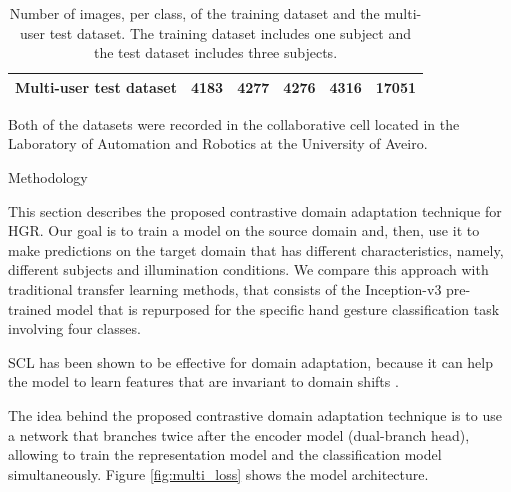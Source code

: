 \documentclass[final]{beamer}
\newlength{\colwidth}
\begin{document}
\begin{frame}[t]
\begin{columns}[t]
\begin{column}{\colwidth}
\begin{table}[!ht]
\begin{tabular}{lccccc}
      Multi-user test dataset & \num{4183} & \num{4277} & \num{4276} & \num{4316} & \textbf{\num{17051}}\\
      \bottomrule
    \end{tabular}
    \caption{Number of images, per class, of the training dataset and the multi-user test dataset. The training dataset includes one subject and the test dataset includes three subjects.\label{tab:dataset}}
  \end{table}

  Both of the datasets were recorded in the collaborative cell \cite{RATO2022497} located in 
  the Laboratory of Automation and Robotics at the University of Aveiro.

  \begin{block}{Methodology}

    This section describes the proposed contrastive domain adaptation technique for HGR. 
    Our goal is to train a model on the source domain and, then, use it to make
    predictions on the target domain that has different characteristics, namely, different subjects
    and illumination conditions. We compare this approach with traditional transfer learning methods, that 
    consists of the Inception-v3 pre-trained model that is repurposed
    for the specific hand gesture classification task involving four classes.

    SCL has been shown to be effective for domain adaptation, 
    because it can help the model to learn features that are invariant to domain shifts \cite{Scalbert2021}.
    
    The idea behind the proposed contrastive domain adaptation technique is to use a network that 
    branches twice after the encoder model (dual-branch head), allowing to train the representation 
    model and the classification model simultaneously. Figure \autoref{fig:multi_loss} shows the model architecture.


\end{block}
\end{column}
\end{columns}
\end{frame}
\end{document}
